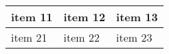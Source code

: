 \begin{tabu} to 0.8\textwidth { | X[l] | X[c] | X[r] | }
 \hline
 item 11 & item 12 & item 13 \\
 \hline
 item 21  & item 22  & item 23  \\
\hline
\end{tabu}